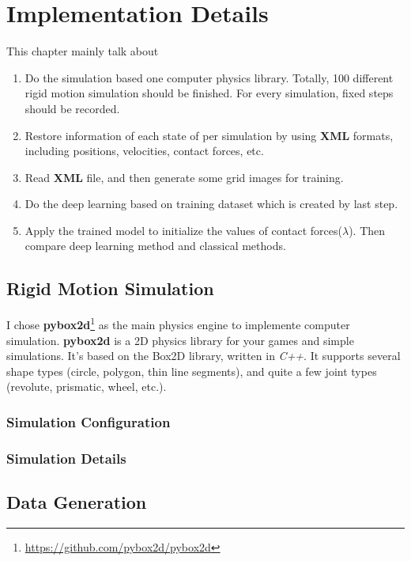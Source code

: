 \chapter{Implementation Details}
\label{details}
This chapter mainly talk about 
\begin{enumerate}
    \item Do the simulation based one computer physics library. Totally, 100 different rigid motion simulation should be finished. For every simulation, fixed steps should be recorded.
    \item Restore information of each state of per simulation by using \textbf{XML} formats, including positions, velocities, contact forces, etc.
    \item Read \textbf{XML} file, and then generate some grid images for training.
    \item Do the deep learning based on training dataset which is created by last step.
    \item Apply the trained model to initialize the values of contact forces($\lambda$). Then compare deep learning method and classical methods.
\end{enumerate}

\section{Rigid Motion Simulation}

I chose \textbf{pybox2d}\footnote{\url{https://github.com/pybox2d/pybox2d}} as the main physics engine to implemente computer simulation. \textbf{pybox2d} is a 2D physics library for your games and simple simulations. It's based on the Box2D library, written in \textit{C++}. It supports several shape types (circle, polygon, thin line segments), and quite a few joint types (revolute, prismatic, wheel, etc.).

\subsection{Simulation Configuration}

\subsection{Simulation Details}


\section{Data Generation}

